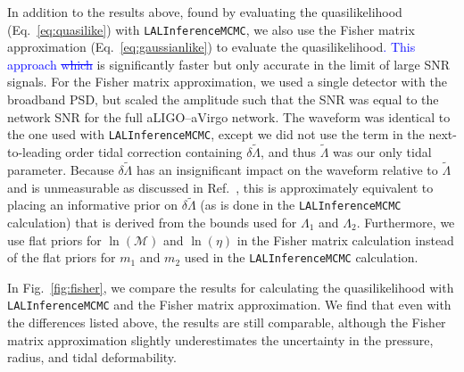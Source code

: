 \documentclass[twocolumn,prd,amssymb,aps,nofootinbib,showpacs,epsf]{revtex4}
\newcommand\les[2]{\textcolor{blue}{{#1}\sout{#2}}}
\begin{document}
In addition to the results above, found by evaluating the quasilikelihood (Eq.~\eqref{eq:quasilike}) with \texttt{LALInferenceMCMC}, we also use the Fisher matrix approximation (Eq.~\eqref{eq:gaussianlike}) to evaluate the quasilikelihood\les{.  This approach }{which} is significantly faster but only accurate in the limit of large SNR signals. For the Fisher matrix approximation, we used a single detector with the broadband PSD, but scaled the amplitude such that the SNR was equal to the network SNR for the full aLIGO--aVirgo network. The waveform was identical to the one used with \texttt{LALInferenceMCMC}, except we did not use the term in the next-to-leading order tidal correction containing $\delta\tilde\Lambda$, and thus $\tilde\Lambda$ was our only tidal parameter. Because $\delta\tilde\Lambda$ has an insignificant impact on the waveform relative to $\tilde\Lambda$ and is unmeasurable as discussed in Ref.~\cite{WadeCreightonOchsner2014}, this is approximately equivalent to placing an informative prior on $\delta\tilde\Lambda$ (as is done in the \texttt{LALInferenceMCMC} calculation) that is derived from the bounds used for $\Lambda_1$ and $\Lambda_2$. Furthermore, we use flat priors for $\ln(\mathcal{M})$ and $\ln(\eta)$ in the Fisher matrix calculation instead of the flat priors for $m_1$ and $m_2$ used in the \texttt{LALInferenceMCMC} calculation.

In Fig.~\ref{fig:fisher}, we compare the results for calculating the quasilikelihood with \texttt{LALInferenceMCMC} and the Fisher matrix approximation.  We find that even with the differences listed above, the results are still comparable, although the Fisher matrix approximation slightly underestimates the uncertainty in the pressure, radius, and tidal deformability.
\end{document}
